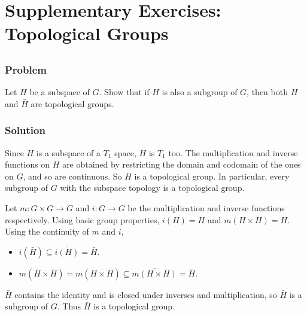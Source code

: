 \section*{Supplementary Exercises: Topological Groups} 
\label{sec-topspace-groups}


\setcounter{subsection}{2} %
\subsection{}

\subsubsection{Problem}
Let $H$ be a subspace of $G$. Show that if $H$ is also a subgroup of $G$, then both $H$ and $\bar H$ are topological groups.

\subsubsection{Solution}
Since $H$ is a subspace of a $T_1$ space, $H$ is $T_1$ too. The multiplication and inverse functions on $H$ are obtained by restricting the domain and codomain of the ones on $G$, and so are continuous. So $H$ is a topological group. In particular, every subgroup of $G$ with the subspace topology is a topological group.

Let $m : G \times G \to G$ and $i : G \to G$ be the multiplication and inverse functions respectively. Using basic group properties, $i(H) = H$ and $m(H \times H) = H$. Using the continuity of $m$ and $i$,
\begin{itemize}
\item $i(\bar H) \subseteq \overline{i(H)} = \bar H$.
\item $m(\bar H \times \bar H) = m(\overline{H \times H}) \subseteq \overline{m(H \times H)} = \bar H$.
\end{itemize}
$\bar H$ contains the identity and is closed under inverses and multiplication, so $\bar H$ is a subgroup of $G$. Thus $\bar H$ is a topological group.
